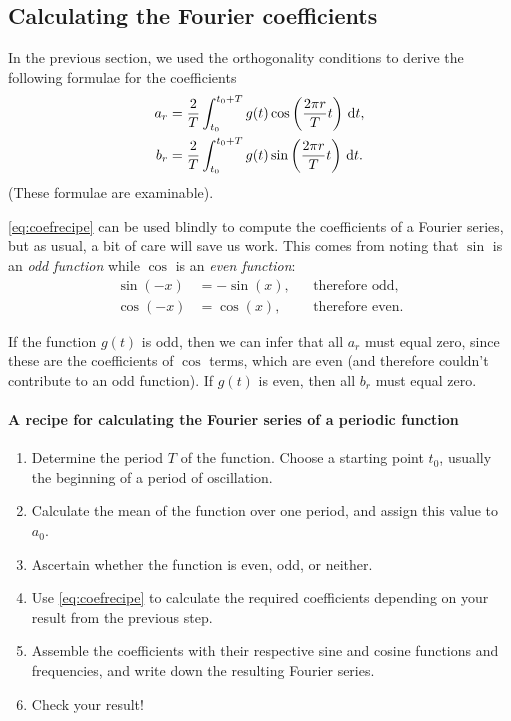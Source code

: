 \documentclass[11pt,twoside,a4paper]{article}
\begin{document}
\subsection{Calculating the Fourier coefficients} 
In the previous section, we used the orthogonality conditions to
derive the following formulae for the coefficients
\begin{subequations}
  \label{eq:coefrecipe}
  \begin{align}
    a_r &= \frac{2}{T}\int_{t_0}^{t_0+T}g(t)
      \cos\left(\frac{2\pi r}{T}t\right)\,\textrm{d} t, \\
    b_r &= \frac{2}{T}\int_{t_0}^{t_0+T}g(t)
      \sin\left(\frac{2\pi r}{T}t\right)\,\textrm{d} t.
  \end{align}
\end{subequations}
(These formulae are examinable).

\autoref{eq:coefrecipe} can be used blindly to compute the
coefficients of a Fourier series, but as usual, a bit of care will
save us work.  This comes from noting that $\sin$ is an \textit{odd
  function} while $\cos$ is an \textit{even function}:
\begin{align}
  \sin(-x) &= -\sin(x), & &\text{therefore odd},\nonumber\\
  \cos(-x) &= \cos(x),  & &\text{therefore even}.\nonumber
\end{align}

If the function $g(t)$ is odd, then we can infer that all $a_r$ must
equal zero, since these are the coefficients of $\cos$ terms, which
are even (and therefore couldn't contribute to an odd function).  If
$g(t)$ is even, then all $b_r$ must equal zero.

\paragraph{A recipe for calculating the Fourier series of a periodic
  function}
\begin{enumerate}
\item Determine the period $T$ of the function. Choose a starting
  point $t_0$, usually the beginning of a period of oscillation.
\item Calculate the mean of the function over one period, and assign
  this value to $a_0$.
\item Ascertain whether the function is even, odd, or neither.
\item Use \autoref{eq:coefrecipe} to calculate the required
  coefficients depending on your result from the previous step.
\item Assemble the coefficients with their respective sine and cosine
  functions and frequencies, and write down the resulting Fourier
  series. 
\item Check your result!
\end{enumerate}
\end{document}
